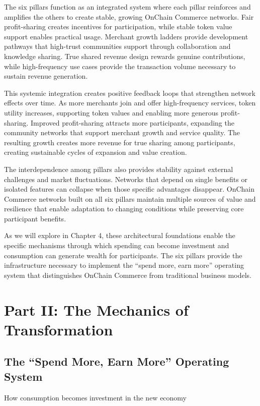 \documentclass[
  Letterpaper,
]{scrbook}
\begin{document}
The six pillars function as an integrated system where each pillar
reinforces and amplifies the others to create stable, growing OnChain
Commerce networks. Fair profit-sharing creates incentives for
participation, while stable token value support enables practical usage.
Merchant growth ladders provide development pathways that high-trust
communities support through collaboration and knowledge sharing. True
shared revenue design rewards genuine contributions, while
high-frequency use cases provide the transaction volume necessary to
sustain revenue generation.

This systemic integration creates positive feedback loops that
strengthen network effects over time. As more merchants join and offer
high-frequency services, token utility increases, supporting token
values and enabling more generous profit-sharing. Improved
profit-sharing attracts more participants, expanding the community
networks that support merchant growth and service quality. The resulting
growth creates more revenue for true sharing among participants,
creating sustainable cycles of expansion and value creation.

The interdependence among pillars also provides stability against
external challenges and market fluctuations. Networks that depend on
single benefits or isolated features can collapse when those specific
advantages disappear. OnChain Commerce networks built on all six pillars
maintain multiple sources of value and resilience that enable adaptation
to changing conditions while preserving core participant benefits.

As we will explore in Chapter 4, these architectural foundations enable
the specific mechanisms through which spending can become investment and
consumption can generate wealth for participants. The six pillars
provide the infrastructure necessary to implement the ``spend more, earn
more'' operating system that distinguishes OnChain Commerce from
traditional business models.

\part{Part II: The Mechanics of Transformation}

\chapter{The ``Spend More, Earn More'' Operating
System}\label{sec-spend-earn-system}

How consumption becomes investment in the new economy
\end{document}
